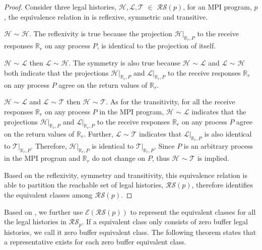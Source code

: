 \begin{proof}
Consider three legal histories, $\mathcal{H}, \mathcal{L}, \mathcal{T}$ $\in$ $\mathcal{RS}(\mathit{p})$, for an MPI program, $\mathit{p}$, the equivalence relation in  is reflexive, symmetric and transitive. 
\begin{compactenum}
\item $\mathcal{H}$ $\sim$ $\mathcal{H}$. The reflexivity is true because the projection $\mathcal{H} | _{\mathbb{R}_r,P}$ to the receive responses $\mathbb{R}_r$ on any process $P$, is identical to the projection of itself.
\item $\mathcal{H}$ $\sim$ $\mathcal{L}$ then $\mathcal{L}$ $\sim$ $\mathcal{H}$. The symmetry is also true because $\mathcal{H}$ $\sim$ $\mathcal{L}$ and $\mathcal{L}$ $\sim$ $\mathcal{H}$ both indicate that the projections $\mathcal{H} | _{\mathbb{R}_r,P}$ and $\mathcal{L} | _{\mathbb{R}_r,P}$ to the receive responses $\mathbb{R}_r$ on any process $P$ agree on the return values of $\mathbb{R}_r$. 
\item $\mathcal{H}$ $\sim$ $\mathcal{L}$ and $\mathcal{L}$ $\sim$ $\mathcal{T}$ then $\mathcal{H}$ $\sim$ $\mathcal{T}$. As for the transitivity, for all the receive responses $\mathbb{R}_r$ on any process $P$ in the MPI program, $\mathcal{H}$ $\sim$ $\mathcal{L}$ indicates that the projections $\mathcal{H} | _{\mathbb{R}_r,P}$ and $\mathcal{L} | _{\mathbb{R}_r,P}$ to the receive responses $\mathbb{R}_r$ on any process $P$ agree on the return values of $\mathbb{R}_r$. Further, $\mathcal{L}$ $\sim$ $\mathcal{T}$ indicates that $\mathcal{L} | _{\mathbb{R}_r,P}$ is also identical to $\mathcal{T} | _{\mathbb{R}_r,P}$. Therefore, $\mathcal{H} | _{\mathbb{R}_r,P}$ is identical to $\mathcal{T} | _{\mathbb{R}_r,P}$. Since $P$ is an arbitrary process in the MPI program and $\mathbb{R}_r$ do not change on $P$, thus $\mathcal{H}$ $\sim$ $\mathcal{T}$ is implied.
\end{compactenum}
Based on the reflexivity, symmetry and transitivity, this equivalence relation is able to partition the reachable set of legal histories, $\mathcal{RS}(\mathit{p})$, therefore identifies the equivalent classes among $\mathcal{RS}(\mathit{p})$.
\end{proof}

Based on , we further use $\mathcal{E}$$(\mathcal{RS}(\mathit{p}))$ to represent the equivalent classes for all the legal histories in $\mathcal{RS}_\mathit{p}$. If a equivalent class only consists of zero buffer legal histories, we call it zero buffer equivalent class. The following theorem states that a representative exists for each zero buffer equivalent class. 

